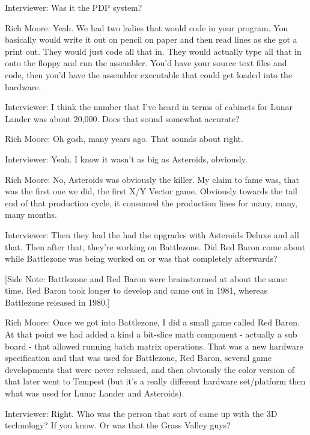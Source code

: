 \textcolor{interviewer}{Interviewer:} Was it the PDP system?

\textcolor{interviewee}{Rich Moore:} Yeah. We had two ladies that would code in your program. You basically would write it out on pencil on paper and then read lines as she got a print out. They would just code all that in. They would actually type all that in onto the floppy and run the assembler. You'd have your source text files and code, then you'd have the assembler executable that could get loaded into the hardware.

\textcolor{interviewer}{Interviewer:} I think the number that I've heard in terms of cabinets for Lunar Lander was about 20,000. Does that sound somewhat accurate?

\textcolor{interviewee}{Rich Moore:} Oh gosh, many years ago. That sounds about right.

\textcolor{interviewer}{Interviewer:} Yeah. I know it wasn't as big as Asteroids, obviously.

\textcolor{interviewee}{Rich Moore:} No, Asteroids was obviously the killer. My claim to fame was, that was the first one we did, the first X/Y Vector game. Obviously towards the tail end of that production cycle, it consumed the production lines for many, many, many months.

\textcolor{interviewer}{Interviewer:} Then they had the had the upgrades with Asteroids Deluxe and all that. Then after that, they're working on Battlezone. Did Red Baron come about while Battlezone was being worked on or was that completely afterwards?

[Side Note: Battlezone and Red Baron were brainstormed at about the same time. Red Baron took longer to develop and came out in 1981, whereas Battlezone released in 1980.]

\textcolor{interviewee}{Rich Moore:} Once we got into Battlezone, I did a small game called Red Baron. At that point we had added a kind a bit-slice math component - actually a sub board - that allowed running batch matrix operations. That was a new hardware specification and that was used for Battlezone, Red Baron, several game developments that were never released, and then obviously the color version of that later went to Tempest (but it's a really different hardware set/platform then what was used for Lunar Lander and Asteroids).

\textcolor{interviewer}{Interviewer:} Right. Who was the person that sort of came up with the 3D technology? If you know. Or was that the Grass Valley guys?

